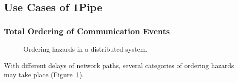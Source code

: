 \subsection{Use Cases of 1Pipe}
\label{subsec:application}

\subsubsection{Total Ordering of Communication Events}
\label{subsec:order-hazards}

\begin{figure}[t]
\centering
    \hspace{0.02\textwidth}
	\caption{Ordering hazards in a distributed system.}
	\label{fig:ordering}
	\vspace{-1.5em}
\end{figure}


With different delays of network paths, several categories of ordering hazards~\cite{gharachorloo1990memory,sewell2010x86} may take place (Figure~\ref{fig:ordering}).

